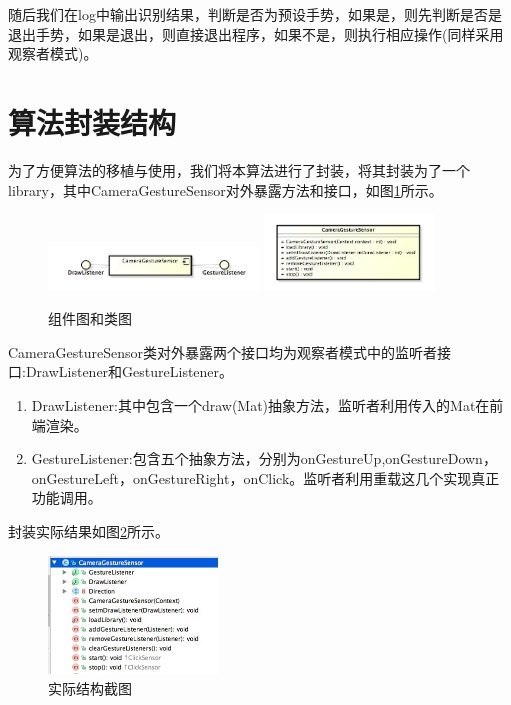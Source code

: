 \documentclass{XDBAthesis}
\begin{document}
随后我们在log中输出识别结果，判断是否为预设手势，如果是，则先判断是否是退出手势，如果是退出，则直接退出程序，如果不是，则执行相应操作(同样采用观察者模式)。

\section{算法封装结构}
为了方便算法的移植与使用，我们将本算法进行了封装，将其封装为了一个library，其中CameraGestureSensor对外暴露方法和接口，如图\ref{fg:cmp}所示。
\begin{figure}[htb]
    \centering
    \includegraphics[width=0.5\textwidth ]{figure/cmp}%
    \includegraphics[width=0.4\textwidth ]{figure/pkg}
    \caption{组件图和类图}
    \label{fg:cmp}
\end{figure}
CameraGestureSensor类对外暴露两个接口均为观察者模式中的监听者接口:DrawListener和GestureListener。
\begin{enumerate}
    \item DrawListener:其中包含一个draw(Mat)抽象方法，监听者利用传入的Mat在前端渲染。
    \item GestureListener:包含五个抽象方法，分别为onGestureUp,onGestureDown，onGestureLeft，onGestureRight，onClick。监听者利用重载这几个实现真正功能调用。
\end{enumerate}
封装实际结果如图\ref{fg:rr}所示。
\begin{figure}[htb]
    \centering
    \includegraphics[width=0.4\textwidth ]{figure/realpkg}
    \caption{实际结构截图}
    \label{fg:rr}
\end{figure}

\ifx\allfiles\undefined
%

\end{document}
